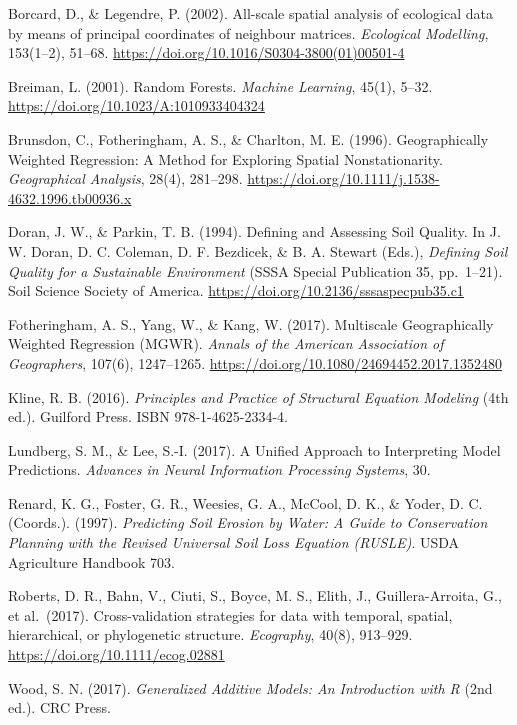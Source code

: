 \documentclass[
  11pt,
  a4paper,
]{ctexart}
\begin{document}
Borcard, D., \& Legendre, P. (2002). All-scale spatial analysis of
ecological data by means of principal coordinates of neighbour matrices.
\emph{Ecological Modelling}, 153(1--2), 51--68.
\url{https://doi.org/10.1016/S0304-3800(01)00501-4}

Breiman, L. (2001). Random Forests. \emph{Machine Learning}, 45(1),
5--32. \url{https://doi.org/10.1023/A:1010933404324}

Brunsdon, C., Fotheringham, A. S., \& Charlton, M. E. (1996).
Geographically Weighted Regression: A Method for Exploring Spatial
Nonstationarity. \emph{Geographical Analysis}, 28(4), 281--298.
\url{https://doi.org/10.1111/j.1538-4632.1996.tb00936.x}

Doran, J. W., \& Parkin, T. B. (1994). Defining and Assessing Soil
Quality. In J. W. Doran, D. C. Coleman, D. F. Bezdicek, \& B. A. Stewart
(Eds.), \emph{Defining Soil Quality for a Sustainable Environment} (SSSA
Special Publication 35, pp.~1--21). Soil Science Society of America.
\url{https://doi.org/10.2136/sssaspecpub35.c1}

Fotheringham, A. S., Yang, W., \& Kang, W. (2017). Multiscale
Geographically Weighted Regression (MGWR). \emph{Annals of the American
Association of Geographers}, 107(6), 1247--1265.
\url{https://doi.org/10.1080/24694452.2017.1352480}

Kline, R. B. (2016). \emph{Principles and Practice of Structural
Equation Modeling} (4th ed.). Guilford Press. ISBN 978-1-4625-2334-4.

Lundberg, S. M., \& Lee, S.-I. (2017). A Unified Approach to
Interpreting Model Predictions. \emph{Advances in Neural Information
Processing Systems}, 30.

Renard, K. G., Foster, G. R., Weesies, G. A., McCool, D. K., \& Yoder,
D. C. (Coords.). (1997). \emph{Predicting Soil Erosion by Water: A Guide
to Conservation Planning with the Revised Universal Soil Loss Equation
(RUSLE)}. USDA Agriculture Handbook 703.

Roberts, D. R., Bahn, V., Ciuti, S., Boyce, M. S., Elith, J.,
Guillera-Arroita, G., et al.~(2017). Cross-validation strategies for
data with temporal, spatial, hierarchical, or phylogenetic structure.
\emph{Ecography}, 40(8), 913--929.
\url{https://doi.org/10.1111/ecog.02881}

Wood, S. N. (2017). \emph{Generalized Additive Models: An Introduction
with R} (2nd ed.). CRC Press.
\end{document}
